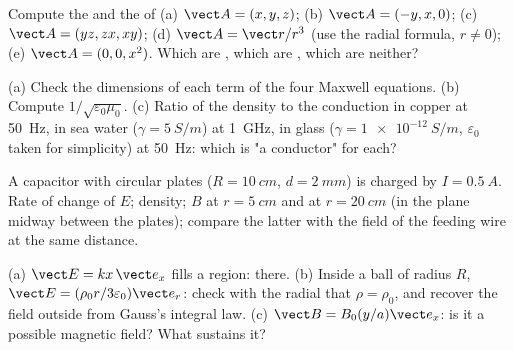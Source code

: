 \begin{exercise}[$\star$]\label{exo:b2:maxwell-equations:1}
Compute the  and the  of (a) $\vect A = (x, y, z)$; (b)
$\vect A = (-y, x, 0)$; (c) $\vect A = (yz, zx, xy)$; (d) $\vect A = \vect r/r^3$
(use the radial formula, $r \ne 0$); (e) $\vect A = (0, 0, x^2)$. Which are
, which are , which are neither?
\end{exercise}

\begin{exercise}[$\star$]\label{exo:b2:maxwell-equations:2}
(a) Check the dimensions of each term of the four Maxwell equations.
(b) Compute $1/\sqrt{\varepsilon_0\mu_0}$. (c) Ratio of the 
density to the conduction  in copper at \qty{50}{Hz}, in
sea water ($\gamma = \qty{5}{S/m}$) at \qty{1}{GHz}, in glass ($\gamma =
\qty{1e-12}{S/m}$, $\varepsilon_0$ taken for simplicity) at \qty{50}{Hz}: which is
"a conductor" for each?
\end{exercise}

\begin{exercise}[$\star$]\label{exo:b2:maxwell-equations:3}
A capacitor with circular plates ($R = \qty{10}{cm}$, $d = \qty{2}{mm}$) is
charged by $I = \qty{0.5}{A}$. Rate of change of $E$;  density; $B$ at $r = \qty{5}{cm}$ and at $r = \qty{20}{cm}$ (in the
plane midway between the plates); compare the latter with the field of
the feeding wire at the same distance.
\end{exercise}

\begin{exercise}[$\star$]\label{exo:b2:maxwell-equations:4}
(a) $\vect E = kx\,\vect e_x$ fills a region:  there. (b)
Inside a ball of radius $R$, $\vect E = (\rho_0r/3\varepsilon_0)\vect e_r$: check with
the radial  that $\rho = \rho_0$, and recover the field outside
from Gauss's integral law. (c) $\vect B = B_0(y/a)\vect e_x$: is it a possible
magnetic field? What  sustains it?
\end{exercise}


